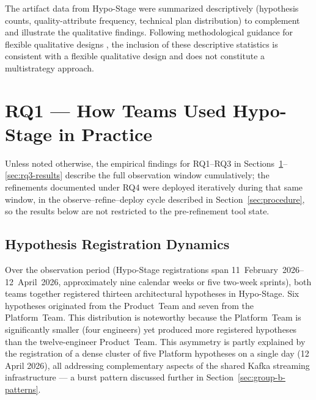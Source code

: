 The artifact data from Hypo-Stage were summarized descriptively (hypothesis
counts, quality-attribute frequency, technical plan distribution) to complement
and illustrate the qualitative findings. Following methodological guidance for flexible qualitative designs \citep{robson2016}, the
inclusion of these descriptive statistics is consistent with a flexible
qualitative design and does not constitute a multistrategy approach.

\section{RQ1 — How Teams Used Hypo-Stage in Practice}
\label{sec:rq1-results}
\label{sec:results-rq1}

Unless noted otherwise, the empirical findings for RQ1--RQ3 in
Sections~\ref{sec:rq1-results}--\ref{sec:rq3-results} describe the full
observation window cumulatively; the refinements documented under RQ4 were
deployed iteratively during that same window, in the
observe--refine--deploy cycle described in Section~\ref{sec:procedure}, so
the results below are not restricted to the pre-refinement tool state.

\subsection{Hypothesis Registration Dynamics}
\label{subsec:registration-dynamics}

Over the observation period (Hypo-Stage registrations span 11~February~2026--12~April~2026, approximately nine calendar weeks or five two-week sprints), both teams together registered thirteen
architectural hypotheses in Hypo-Stage. Six hypotheses originated from the
Product~Team and seven from the Platform~Team. This distribution is noteworthy
because the Platform~Team is significantly smaller (four engineers) yet produced
more registered hypotheses than the twelve-engineer Product~Team. This asymmetry
is partly explained by the registration of a dense cluster of five Platform
hypotheses on a single day (12 April 2026), all addressing complementary aspects
of the shared Kafka streaming infrastructure — a burst pattern discussed further
in Section~\ref{sec:group-b-patterns}.

